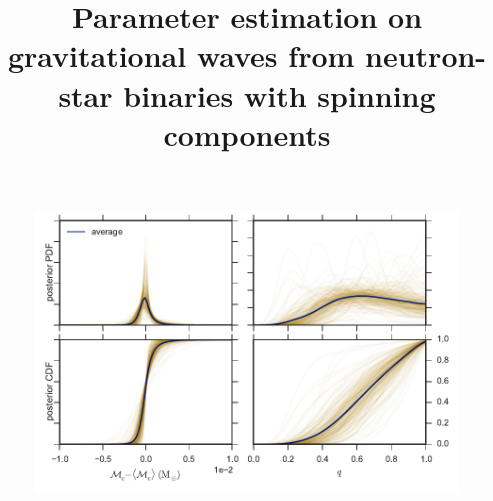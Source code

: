 \documentclass[iop,apj,twocolumn,twocolappendix,numberedappendix]{emulateapj}
\begin{document}
\title{Parameter estimation on gravitational waves from neutron-star binaries with spinning components}















\begin{figure}
  \centering
  \includegraphics[width=1.6\columnwidth]{figures/spinning-masses/quad_mass_grid}
  \caption{\protect} 
\end{figure}
\end{document}

